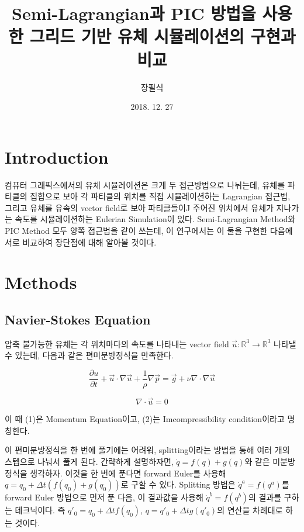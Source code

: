 \documentclass[10pt, A4]{article}
\title{Semi-Lagrangian과 PIC 방법을 사용한 그리드 기반 유체 시뮬레이션의 구현과 비교}
\author{장필식}
\date{2018. 12. 27}
\begin{document}
\maketitle

\begin{abstract}
\end{abstract}

\newpage

\tableofcontents

\newpage

\section{Introduction}

컴퓨터 그래픽스에서의 유체 시뮬레이션은 크게 두 접근방법으로 나뉘는데, 유체를 파티클의 집합으로 보아 각 파티클의 위치를 직접 시뮬레이션하는 Lagrangian 접근법, 그리고 유체를 유속의 vector field로 보아 파티클들이J 주어진 위치에서 유체가 지나가는 속도를 시뮬레이션하는 Eulerian Simulation이 있다. Semi-Lagrangian Method와 PIC Method 모두 양쪽 접근법을 같이 쓰는데, 이 연구에서는 이 둘을 구현한 다음에 서로 비교하여 장단점에 대해 알아볼 것이다.

\section{Methods}

\subsection{Navier-Stokes Equation}

압축 불가능한 유체는 각 위치마다의 속도를 나타내는 vector field $\vec{u} : \mathbb{R}
^3 \rightarrow \mathbb{R}^3$ 나타낼 수 있는데, 다음과 같은 편미분방정식을 만족한다.

\begin{equation}
  \frac{\partial u}{\partial t} + \vec{u} \cdot \nabla{\vec{u}} + \frac{1}{\rho} \nabla{\vec{p}} = \vec{g} + \nu \nabla \cdot \nabla \vec{u}
\end{equation}

\begin{equation}
  \nabla \cdot \vec{u} = 0
\end{equation}

이 때 (1)은 Momentum Equation이고, (2)는 Imcompressibility condition이라고 명칭한다. 

이 편미분방정식을 한 번에 풀기에는 어려워, splitting이라는 방법을 통해 여러 개의 스텝으로 나눠서 풀게 된다.
간략하게 설명하자면, $\dot q = f(q) + g(q)$와 같은 미분방정식을 생각하자.
이것을 한 번에 푼다면 forward Euler를 사용해 $q = q_0 + \Delta t (f(q_0) + g(q_0))$로 구할 수 있다.
Splitting 방법은 $\dot q^a = f(q^a)$를 forward Euler 방법으로 먼저 푼 다음, 이 결과값을 사용해 $\dot q^b = f(q^b)$의 결과를 구하는 테크닉이다. 즉 $q'_0 = q_0 + \Delta t f(q_0)$, $q = q'_0 + \Delta t g(q'_0)$의 연산을 차례대로 하는 것이다. \cite{fluid-sim-cg}
\end{document}
